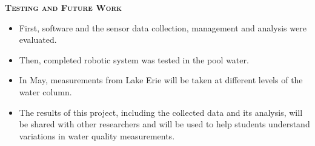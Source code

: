 \documentclass[final,t]{beamer}
\begin{document}
\begin{frame}{}
\begin{columns}
\begin{column}{.33\linewidth}
                \begin{alertblock}{\textsc{\textbf{Testing and Future Work}}}
                    \vspace*{3mm}
                    \begin{itemize}
                    	\item First, software and the sensor data collection,
                      management and analysis were evaluated.
                    	\item Then, completed robotic system was tested in the pool
                      water.
                    	\item In May, measurements from Lake Erie will be taken at
                      different levels of the water column.
                    	\item The results of this project, including the collected
                      data and its analysis, will be shared with other researchers
                      and will be used to help students understand variations in
                      water quality measurements.
                    \end{itemize}

                    \vspace*{3mm}
                \end{alertblock}
            \end{column}

        \end{columns}
    \end{frame}
\end{document}
